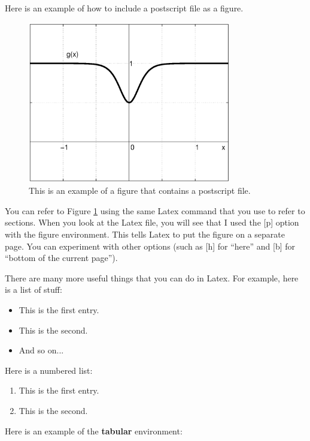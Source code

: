 \documentclass[11pt]{article}
\begin{document}
Here is an example of how to include a postscript file as a figure.
\begin{figure}[p]
\centerline{\includegraphics[width=3.5in]{myfile.ps}}
\caption{This is an example of a figure that contains a postscript file.}
\label{FIG}
\end{figure}
You can refer to Figure \ref{FIG} using the same Latex command
that you use to refer to sections.
When you look at the Latex file, you will see that I used the
[p] option with the figure environment.  This tells Latex to
put the figure on a separate page.
You can experiment with other options (such as [h] for ``here''
and [b] for ``bottom of the current page'').

There are many more useful things that you can do in Latex.  For example,
here is a list of stuff:
\begin{itemize}
\item This is the first entry.
\item This is the second.
\item And so on...
\end{itemize}
Here is a numbered list:
\begin{enumerate}
\item This is the first entry.
\item This is the second.
\end{enumerate}

Here is an example of the \textbf{tabular} environment:
\end{document}

